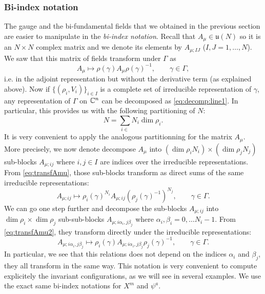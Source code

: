         \subsubsection{Bi-index notation}

            The gauge and the bi-fundamental fields that we obtained in the previous section are easier to manipulate in the \emph{bi-index notation}. Recall that $A_\mu\in\mathfrak{u}(N)$ so it is an $N\times N$ complex matrix and we denote its elements by $A_{\mu;IJ}$ ($I,J=1,\dots,N$). We saw that this matrix of fields transform under $\Gamma$ as
            \begin{equation}
                A_\mu\mapsto \rho(\gamma)A_\mu \rho(\gamma)^{-1},\qquad \gamma\in \Gamma,\label{eq:transfAmu1}
            \end{equation}
            i.e. in the adjoint representation but without the derivative term (as explained above). Now if $\{(\rho_i,V_i)\}_{i\in I}$ is a complete set of irreducible representation of $\gamma$, any representation of $\Gamma$ on $\mathbb{C}^n$ can be decomposed as \eqref{eq:decomp:line1}. In particular, this provides us with the following partitioning of $N$:
            \begin{equation}
                N=\sum_{i\in}N_i\dim\rho_i.
            \end{equation}
            It is very convenient to apply the analogous partitionning for the matrix $A_\mu$. More precisely, we now denote decompose $A_\mu$ into $(\dim\rho_iN_i)\times(\dim\rho_jN_j)$ sub-blocks $A_{\mu;ij}$ where $i,j\in I$ are indices over the irreducible representations. From \eqref{eq:transfAmu}, those sub-blocks transform as direct sums of the same irreducible representations:
            \begin{equation}
                A_{\mu;ij}\mapsto \rho_i(\gamma)^{N_i}A_{\mu;ij}(\rho_j(\gamma)^{-1})^{N_j},\qquad \gamma\in\Gamma.\label{eq:transfAmu2}
            \end{equation}
            We can go one step further and decompose the sub-blocks $A_{\mu;ij}$ into $\dim\rho_i\times\dim\rho_j$ sub-sub-blocks $A_{\mu;i\alpha_i,j\beta_j}$ where $\alpha_i,\beta_i=0,\dots N_i-1$. From \eqref{eq:transfAmu2}, they transform directly under the irreducible representations:
            \begin{equation}
                \boxed{A_{\mu;i\alpha_i,j\beta_j}\mapsto\rho_i(\gamma)A_{\mu;i\alpha_i,j\beta_j}\rho_j(\gamma)^{-1},\qquad \gamma\in\Gamma.}
            \end{equation}
            In particular, we see that this relations does not depend on the indices $\alpha_i$ and $\beta_j$, they all transform in the same way. This notation is very convenient to compute explicitely the invariant configurations, as we will see in several examples. We use the exact same bi-index notations for $X^m$ and $\psi^a$.

